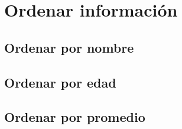 \section{Ordenar información}
\subsection{Ordenar por nombre}
\subsection{Ordenar por edad}
\subsection{Ordenar por promedio}
